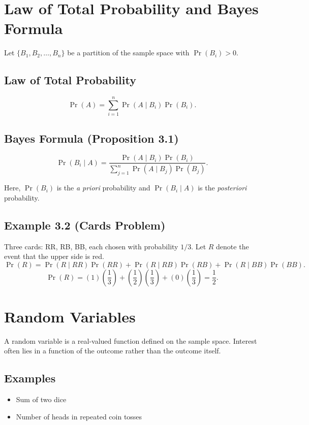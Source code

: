 \documentclass[11pt]{article}
\begin{document}
\section{Law of Total Probability and Bayes Formula}

Let $\{B_1, B_2, \dots, B_n\}$ be a partition of the sample space with $\Pr(B_i) > 0$.

\subsection*{Law of Total Probability}
\[
\Pr(A) = \sum_{i=1}^{n} \Pr(A \mid B_i)\Pr(B_i).
\]

\subsection*{Bayes Formula (Proposition 3.1)}
\[
\Pr(B_i \mid A) =
\frac{\Pr(A \mid B_i)\Pr(B_i)}
{\sum_{j=1}^{n} \Pr(A \mid B_j)\Pr(B_j)}.
\]

Here, $\Pr(B_i)$ is the \textit{a priori} probability and $\Pr(B_i \mid A)$ is the \textit{posteriori} probability.

\subsection{Example 3.2 (Cards Problem)}
Three cards: RR, RB, BB, each chosen with probability $1/3$.  
Let $R$ denote the event that the upper side is red.
\[
\Pr(R) = \Pr(R \mid RR)\Pr(RR) + \Pr(R \mid RB)\Pr(RB) + \Pr(R \mid BB)\Pr(BB).
\]
\[
\Pr(R) = (1)\left(\frac{1}{3}\right) + \left(\frac{1}{2}\right)\left(\frac{1}{3}\right) + (0)\left(\frac{1}{3}\right)
= \frac{1}{2}.
\]

\section{Random Variables}
A random variable is a real-valued function defined on the sample space.  
Interest often lies in a function of the outcome rather than the outcome itself.

\subsection*{Examples}
\begin{itemize}
\item Sum of two dice
\item Number of heads in repeated coin tosses
\end{itemize}
\end{document}
